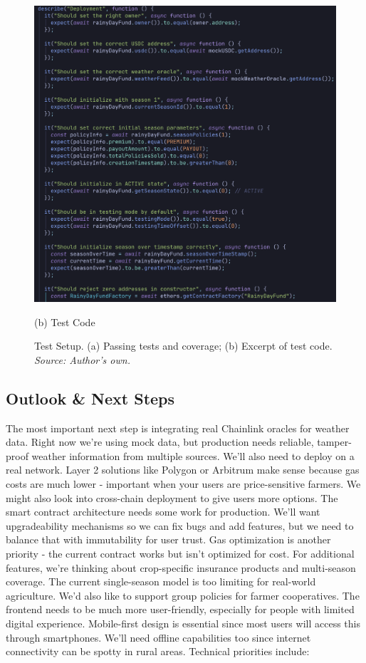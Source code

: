 \documentclass[11pt,a4paper]{article}
\begin{document}
\begin{figure}[H]
\begin{minipage}[b]{0.48\textwidth}
			\includegraphics[width=0.95\linewidth]{graphics/Test_Code}
			\caption*{(b) Test Code}
		\end{minipage}
		\caption{Test Setup. (a) Passing tests and coverage; (b) Excerpt of test code. \\ \textit{Source: Author's own.}}
		\label{fig:test-set-up}
	\end{figure}


	\subsection{Outlook \& Next Steps}\label{subsec:outlook}

	The most important next step is integrating real Chainlink oracles for weather data.
	Right now we're using mock data, but production needs reliable, tamper-proof weather information from multiple sources.
	We'll also need to deploy on a real network.
	Layer 2 solutions like Polygon or Arbitrum make sense because gas costs are much lower - important when your users are price-sensitive farmers.
	We might also look into cross-chain deployment to give users more options.
	The smart contract architecture needs some work for production.
	We'll want upgradeability mechanisms so we can fix bugs and add features, but we need to balance that with immutability for user trust.
	Gas optimization is another priority - the current contract works but isn't optimized for cost.
	For additional features, we're thinking about crop-specific insurance products and multi-season coverage.
	The current single-season model is too limiting for real-world agriculture.
	We'd also like to support group policies for farmer cooperatives.
	The frontend needs to be much more user-friendly, especially for people with limited digital experience.
	Mobile-first design is essential since most users will access this through smartphones.
	We'll need offline capabilities too since internet connectivity can be spotty in rural areas.
	Technical priorities include:
\end{document}
